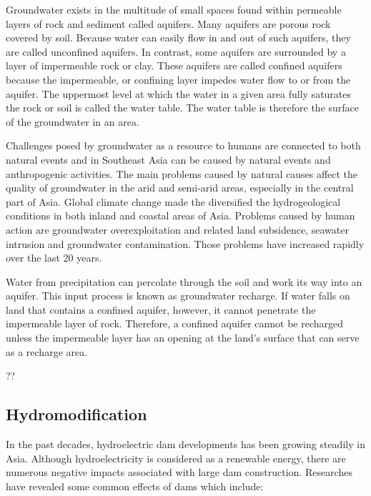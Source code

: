 Groundwater exists in the multitude of small spaces found within permeable layers of rock and sediment called aquifers. Many aquifers are porous rock covered by soil. Because water can easily flow in and out of such aquifers, they are called unconfined aquifers. In contrast, some aquifers are surrounded by a layer of impermeable rock or clay. These aquifers are called confined aquifers because the impermeable, or confining layer impedes water flow to or from the aquifer. The uppermost level at which the water in a given area fully saturates the rock or soil is called the water table. The water table is therefore the surface of the groundwater in an area.
   
Challenges posed by groundwater as a resource to humans are connected to both natural events and in Southeast Asia can be caused by natural events and anthropogenic activities. The main problems caused by natural causes affect the quality of groundwater in the arid and semi-arid areas, especially in the central part of Asia. Global climate change made the diversified the hydrogeological conditions in both inland and coastal areas of Asia. Problems caused by human action are groundwater overexploitation and related land subsidence, seawater intrusion and groundwater contamination. Those problems have increased rapidly over the last 20 years. 
  
Water from precipitation can percolate through the soil and work its way into an aquifer. This input process is known as groundwater recharge. If water falls on land that contains a confined aquifer, however, it cannot penetrate the impermeable layer of rock. Therefore, a confined aquifer cannot be recharged unless the impermeable layer has an opening at the land's surface that can serve as a recharge area. 

\citet{erban2014groundwater}??

\subsection{Hydromodification}

  In the past decades, hydroelectric dam developments has been growing steadily in Asia. Although hydroelectricity is considered as a renewable energy, there are numerous negative impacts associated with large dam construction. Researches have revealed some common effects of dams which include:
  
